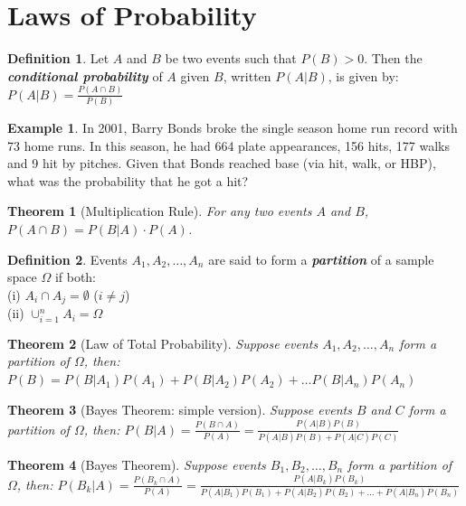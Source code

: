 \documentclass[
  11pt,
]{book}
\newtheorem{theorem}{Theorem}[chapter]
\theoremstyle{definition}
\newtheorem{definition}{Definition}[chapter]
\theoremstyle{definition}
\newtheorem{example}{Example}[chapter]
\theoremstyle{definition}
\theoremstyle{definition}
\theoremstyle{remark}
\begin{document}
\hypertarget{laws-of-probability}{%
\section{Laws of Probability}\label{laws-of-probability}}

\begin{definition}
Let \(A\) and \(B\) be two events such that \(P(B)>0\). Then the \textbf{\emph{conditional probability}} of \(A\) given \(B\), written \(P(A|B)\), is given by:
\(P(A|B) = \frac{P(A \cap B)}{P(B)}\)
\end{definition}

\begin{example}
In 2001, Barry Bonds broke the single season home run record with 73 home runs. In this season, he had 664 plate appearances, 156 hits, 177 walks and 9 hit by pitches. Given that Bonds reached base (via hit, walk, or HBP), what was the probability that he got a hit?
\end{example}

\hfill\break
\hfill\break
\hfill\break

\begin{theorem}[Multiplication Rule]
For any two events \(A\) and \(B\), \(P(A \cap B) = P(B|A) \cdot P(A)\).
\end{theorem}

\begin{definition}
Events \(A_1, A_2, \ldots, A_n\) are said to form a \textbf{\emph{partition}} of a sample space \(\Omega\) if both:\\
(i) \(A_i \cap A_j = \emptyset\) (\(i \neq j\))\\
(ii) \(\cup_{i=1}^n A_i = \Omega\)\\
\end{definition}

\begin{theorem}[Law of Total Probability]
Suppose events \(A_1, A_2, \ldots, A_n\) form a partition of \(\Omega\), then:
\(P(B) = P(B|A_1)P(A_1) + P(B|A_2)P(A_2) + \ldots P(B|A_n)P(A_n)\)
\end{theorem}

\begin{theorem}[Bayes Theorem: simple version]
Suppose events \(B\) and \(C\) form a partition of \(\Omega\), then:
\(P(B|A) = \frac{P(B \cap A)}{P(A)} = \frac{P(A|B)P(B)}{P(A|B)P(B)+P(A|C)P(C)}\)
\end{theorem}

\begin{theorem}[Bayes Theorem]
Suppose events \(B_1, B_2, \ldots, B_n\) form a partition of \(\Omega\), then:
\(P(B_k|A) = \frac{P(B_k \cap A)}{P(A)} = \frac{P(A|B_k)P(B_k)}{P(A|B_1)P(B_1)+P(A|B_2)P(B_2) + \ldots + P(A|B_n)P(B_n)}\)
\end{theorem}
\end{document}
